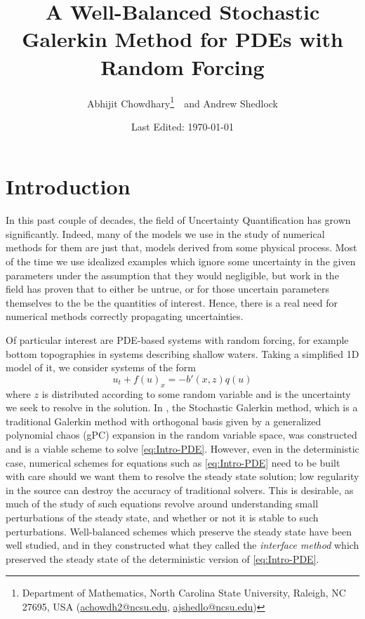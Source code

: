 \documentclass[12pt]{article}
\begin{document}
\title{
  A Well-Balanced Stochastic Galerkin Method for PDEs with Random Forcing
}
\author{%
  Abhijit Chowdhary\footnote{%
    Department of Mathematics, North Carolina State University, Raleigh, NC
    27695, USA (\url{achowdh2@ncsu.edu}, \url{ajshedlo@ncsu.edu})
  }\ \ 
  and Andrew Shedlock\footnotemark[1]
}
\date{Last Edited: \today}
\maketitle

\section{Introduction}
In this past couple of decades, the field of Uncertainty Quantification has grown significantly.
Indeed, many of the models we use in the study of numerical methods for them are just that, models derived from some physical process.
Most of the time we use idealized examples which ignore some uncertainty in the given parameters under the assumption that they would negligible, but work in the field has proven that to either be untrue, or for those uncertain parameters themselves to the be the quantities of interest.
Hence, there is a real need for numerical methods correctly propagating uncertainties.

Of particular interest are PDE-based systems with random forcing, for example bottom topographies in systems describing shallow waters. Taking a simplified 1D model of it, we consider systems of the form
\begin{equation}
    \label{eq:Intro-PDE}
    u_t + f(u)_x = -b'(x,z) q(u)
\end{equation}
where $z$ is distributed according to some random variable and is the uncertainty we seek to resolve in the solution.
In \cite{Xiu2002, Xiu2010}, the Stochastic Galerkin method, which is a traditional Galerkin method with orthogonal basis given by a generalized polynomial chaos (gPC) expansion in the random variable space, was constructed and is a viable scheme to solve \eqref{eq:Intro-PDE}.
However, even in the deterministic case, numerical schemes for equations such as \eqref{eq:Intro-PDE} need to be built with care should we want them to resolve the steady state solution; low regularity in the source can destroy the accuracy of traditional solvers.
This is desirable, as much of the study of such equations revolve around understanding small perturbations of the steady state, and whether or not it is stable to such perturbations.
Well-balanced schemes which preserve the steady state have been well studied, and in \cite{Jin2001} they constructed what they called the \textit{interface method} which preserved the steady state of the deterministic version of \eqref{eq:Intro-PDE}.
\end{document}
